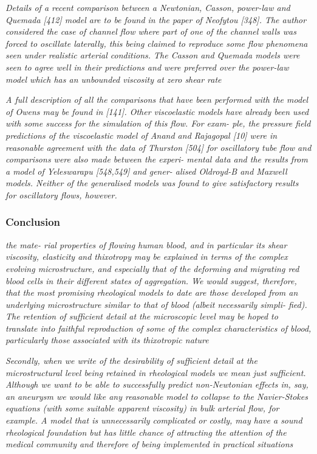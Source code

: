 \documentclass[11pt,letterpaper]{article}
\begin{document}
\textit{Details of a recent comparison between a Newtonian, Casson, power-law
and Quemada [412] model are to be found in the paper of Neofytou [348]. The author considered the case of channel flow where part of one of the channel walls was forced to oscillate laterally, this being claimed to reproduce some flow phenomena seen under realistic arterial conditions. The Casson and Quemada models were seen to agree well in their predictions and were preferred over the power-law model which has an unbounded viscosity at zero shear rate}


\textit{A full description of all the comparisons that have been performed with
the model of Owens may be found in [141]. Other viscoelastic models have already been used with some success for the simulation of this flow. For exam- ple, the pressure field predictions of the viscoelastic model of Anand and Rajagopal [10] were in reasonable agreement with the data of Thurston [504] for oscillatory tube flow and comparisons were also made between the experi- mental data and the results from a model of Yeleswarapu [548,549] and gener- alised Oldroyd-B and Maxwell models. Neither of the generalised models was found to give satisfactory results for oscillatory flows, however.}

\subsubsection*{Conclusion}

\textit{the mate- rial properties of flowing human blood, and in particular its shear viscosity, elasticity and thixotropy may be explained in terms of the complex evolving microstructure, and especially that of the deforming and migrating red blood cells in their different states of aggregation. We would suggest, therefore, that the most promising rheological models to date are those developed from an underlying microstructure similar to that of blood (albeit necessarily simpli- fied). The retention of sufficient detail at the microscopic level may be hoped to translate into faithful reproduction of some of the complex characteristics of blood, particularly those associated with its thixotropic nature}

\textit{Secondly, when we write of the desirability of sufficient detail at the microstructural level being retained in rheological models we mean just sufficient. Although we want to be able to successfully predict non-Newtonian effects in, say, an aneurysm we would like any reasonable model to collapse to the Navier-Stokes equations (with some suitable apparent viscosity) in bulk arterial flow, for example. A model that is unnecessarily complicated or costly, may have a sound rheological foundation but has little chance of attracting the attention of the medical community and therefore of being implemented in practical situations}
\end{document}
